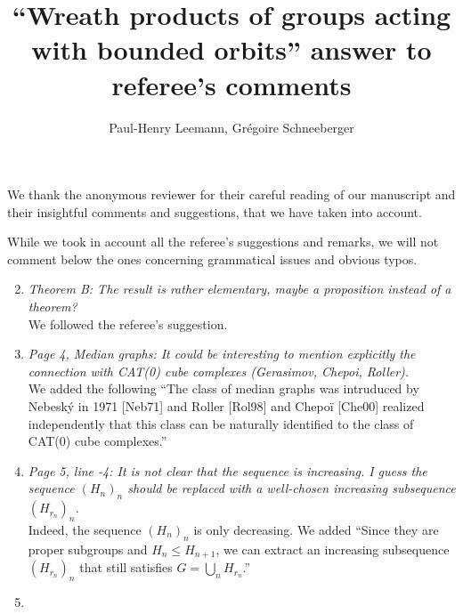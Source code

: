 \documentclass[english,a4paper]{article}
\title{``Wreath products of groups acting with bounded orbits'' answer to referee's comments}
\author{Paul-Henry Leemann, Grégoire Schneeberger}
\begin{document}
\maketitle
%
%
%
%
%
%
%
%
%
%
We thank the anonymous reviewer for their careful reading of our manuscript and their insightful comments and suggestions, that we have taken into account.

While we took in account all the referee’s suggestions and remarks, we will not comment below the ones concerning grammatical issues and obvious typos.
\begin{enumerate}
%
\setcounter{enumi}{1}
\item\textit{Theorem B: The result is rather elementary, maybe a proposition instead of a theorem?}\\
We followed the referee's suggestion.
%
\item\textit{Page 4, Median graphs: It could be interesting to mention explicitly the connection with CAT(0) cube complexes (Gerasimov, Chepoi, Roller).}\\
We added the following ``The class of median graphs was intruduced by Nebesk\'y in 1971 [Neb71] and  Roller [Rol98] and Chepoï [Che00] realized independently that this class can be naturally identified to the class of CAT(0) cube complexes.''
%
\item\textit{Page 5, line -4: It is not clear that the sequence is increasing. I guess the sequence $(H_n)_n$ should be replaced with a well-chosen increasing subsequence $(H_{r_n})_n$.
}\\
Indeed, the sequence $(H_n)_n$ is only decreasing. We added ``Since they are proper subgroups and $H_n\leq H_{n+1}$, we can extract an increasing subsequence $(H_{r_n})_n$ that still satisfies $G=\bigcup_n H_{r_n}$.''
%
\item\textit{ }\\







\end{enumerate}
\end{document}
